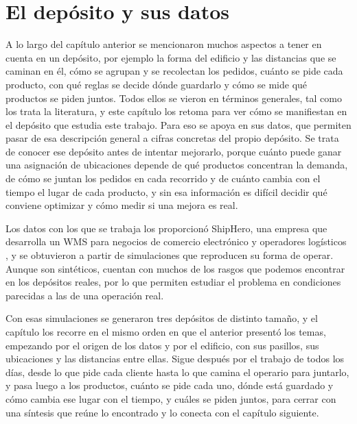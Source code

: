 \chapter{El depósito y sus datos}
\label{chapter:deposito}

A lo largo del capítulo anterior se mencionaron muchos aspectos a tener en cuenta en un depósito, por ejemplo la forma del edificio y las distancias que se caminan en él, cómo se agrupan y se recolectan los pedidos, cuánto se pide cada producto, con qué reglas se decide dónde guardarlo y cómo se mide qué productos se piden juntos.
Todos ellos se vieron en términos generales, tal como los trata la literatura, y este capítulo los retoma para ver cómo se manifiestan en el depósito que estudia este trabajo.
Para eso se apoya en sus datos, que permiten pasar de esa descripción general a cifras concretas del propio depósito.
Se trata de conocer ese depósito antes de intentar mejorarlo, porque cuánto puede ganar una asignación de ubicaciones depende de qué productos concentran la demanda, de cómo se juntan los pedidos en cada recorrido y de cuánto cambia con el tiempo el lugar de cada producto, y sin esa información es difícil decidir qué conviene optimizar y cómo medir si una mejora es real.

Los datos con los que se trabaja los proporcionó ShipHero, una empresa que desarrolla un \gls{WMS} para negocios de comercio electrónico y operadores logísticos \citep{shiphero2026}, y se obtuvieron a partir de simulaciones que reproducen su forma de operar.
Aunque son sintéticos, cuentan con muchos de los rasgos que podemos encontrar en los depósitos reales, por lo que permiten estudiar el problema en condiciones parecidas a las de una operación real.

Con esas simulaciones se generaron tres depósitos de distinto tamaño, y el capítulo los recorre en el mismo orden en que el anterior presentó los temas, empezando por el origen de los datos y por el edificio, con sus pasillos, sus ubicaciones y las distancias entre ellas.
Sigue después por el trabajo de todos los días, desde lo que pide cada cliente hasta lo que camina el operario para juntarlo, y pasa luego a los productos, cuánto se pide cada uno, dónde está guardado y cómo cambia ese lugar con el tiempo, y cuáles se piden juntos, para cerrar con una síntesis que reúne lo encontrado y lo conecta con el capítulo siguiente.

